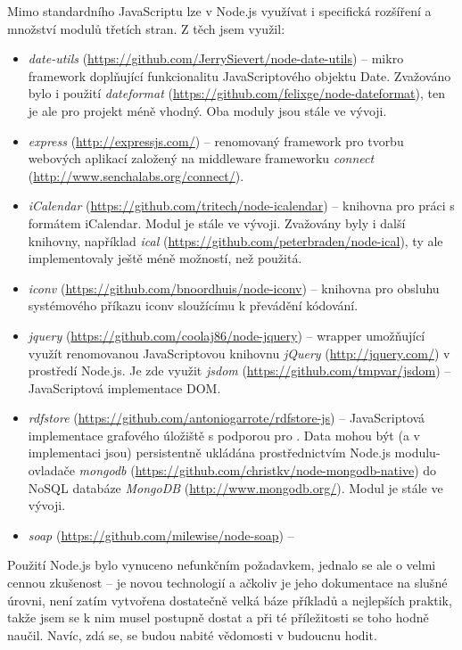 Mimo standardního JavaScriptu lze v Node.js využívat i specifická rozšíření a množství modulů třetích stran. Z těch jsem využil:
\begin{itemize}
 \item \emph{date-utils} (\url{https://github.com/JerrySievert/node-date-utils}) -- mikro framework doplňující funkcionalitu JavaScriptového objektu Date. Zvažováno bylo i použití \emph{dateformat} (\url{https://github.com/felixge/node-dateformat}), ten je ale pro projekt méně vhodný. Oba moduly jsou stále ve vývoji.
 \item \emph{express} (\url{http://expressjs.com/}) -- renomovaný framework pro tvorbu webových aplikací založený na middleware frameworku \emph{connect} (\url{http://www.senchalabs.org/connect/}).
 \item \emph{iCalendar} (\url{https://github.com/tritech/node-icalendar}) -- knihovna pro práci s formátem iCalendar. Modul je stále ve vývoji. Zvažovány byly i další knihovny, například \emph{ical} (\url{https://github.com/peterbraden/node-ical}), ty ale implementovaly ještě méně možností, než použitá.
 \item \emph{iconv} (\url{https://github.com/bnoordhuis/node-iconv}) -- knihovna pro obsluhu systémového příkazu iconv sloužícímu k převádění kódování.
 \item \emph{jquery} (\url{https://github.com/coolaj86/node-jquery}) -- wrapper umožňující využít renomovanou JavaScriptovou knihovnu \emph{jQuery} (\url{http://jquery.com/}) v prostředí Node.js. Je zde využit \emph{jsdom} (\url{https://github.com/tmpvar/jsdom}) -- JavaScriptová implementace DOM.
 \item \emph{rdfstore} (\url{https://github.com/antoniogarrote/rdfstore-js}) -- JavaScriptová implementace \emph{} grafového úložiště s podporou pro \emph{}. Data mohou být (a v implementaci  jsou) persistentně ukládána prostřednictvím Node.js modulu-ovladače \emph{mongodb} (\url{https://github.com/christkv/node-mongodb-native}) do NoSQL databáze \emph{MongoDB} (\url{http://www.mongodb.org/}). Modul je stále ve vývoji.
 \item \emph{soap} (\url{https://github.com/milewise/node-soap}) -- 
\end{itemize}

Použití Node.js bylo vynuceno nefunkčním požadavkem, jednalo se ale o velmi cennou zkušenost -- je novou technologií a ačkoliv je jeho dokumentace na slušné úrovni, není zatím vytvořena dostatečně velká báze příkladů a nejlepších praktik, takže jsem se k nim musel postupně dostat a při té příležitosti se toho hodně naučil. Navíc, zdá se, se budou nabité vědomosti v budoucnu hodit.

